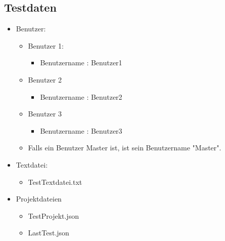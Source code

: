 \documentclass{scrartcl}
\begin{document}
\subsection{Testdaten}
\begin{itemize}
\item Benutzer:
\begin{itemize}
\item Benutzer 1:
\begin{itemize}
\item Benutzername : Benutzer1
\end{itemize} 
\item Benutzer 2
\begin{itemize}
\item Benutzername : Benutzer2
\end{itemize} 
\item Benutzer 3
\begin{itemize}
\item Benutzername : Benutzer3
\end{itemize}
\item Falls ein Benutzer Master ist, ist sein Benutzername "Master". 
\end{itemize}
\item Textdatei: 
\begin{itemize}
\item TestTextdatei.txt
\end{itemize}
\item Projektdateien
\begin{itemize}
\item TestProjekt.json
\item LastTest.json
\end{itemize}
\end{itemize}
\end{document}
